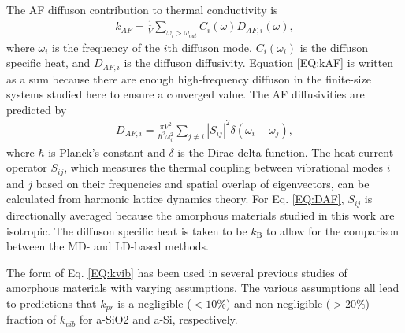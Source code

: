 \documentclass[aps,prb,onecolumn,preprint,superscriptaddress,footinbib,amsmath,amssymb,floatfix]{revtex4}
\begin{document}
The AF diffuson contribution to thermal conductivity is
\cite{feldman_thermal_1993,feldman_numerical_1999}
\begin{equation}\label{EQ:kAF}
\begin{split}
k_{AF} = \frac{1}{V}\sum_{\omega_i>\omega_{cut}} C_i(\omega) D_{AF,i}(\omega), 
\end{split}
\end{equation}
where $\omega_i$ is the frequency of the $i$th diffuson mode, $C_i(\omega_i)$ 
is the diffuson specific heat, and $D_{AF,i}$ is the diffuson diffusivity.
Equation \eqref{EQ:kAF} is written as a sum because there are enough 
high-frequency 
diffuson in the finite-size systems studied here to ensure a converged 
value.\cite{feldman_thermal_1993,feldman_numerical_1999} 
The AF diffusivities are predicted by\cite{allen_thermal_1993} 
\begin{equation}\label{EQ:DAF}
\begin{split}
D_{AF,i} = \frac{\pi V^2}{\hbar^2\omega^2_i}\sum_{j\neq i}
|S_{ij}|^2 \delta(\omega_i - \omega_j),
\end{split}
\end{equation}
where $\hbar$ is Planck's constant and $\delta$ is the Dirac delta 
function. The heat current operator $S_{ij}$,
which measures the thermal coupling 
between vibrational modes $i$ and $j$ based on their frequencies and 
spatial overlap of eigenvectors, 
can be calculated from harmonic lattice dynamics theory.
\cite{allen_thermal_1993,feldman_thermal_1993,feldman_numerical_1999} 
For Eq. \eqref{EQ:DAF}, $S_{ij}$ is directionally averaged because 
the amorphous materials studied in this work are isotropic. 
The diffuson specific heat is taken to be $k_{\text{B}}$ 
to allow for the comparison between the MD- and LD-based 
methods.  

The form of Eq. \eqref{EQ:kvib} has been used in 
several previous studies of amorphous materials with varying 
assumptions.\cite{feldman_thermal_1993,cahill_thermal_1994,
baldi_thermal_2008,
liu_high_2009,yang_anomalously_2010,feldman_numerical_1999,
baldi_thermal_2008,he_heat_2011} 
The various 
assumptions all lead to predictions that $k_{pr}$ is a negligible 
($< 10\%$) 
and non-negligible ($> 20\%$) fraction of $k_{vib}$ 
for 
a-SiO2\cite{baldi_thermal_2008} and 
a-Si\cite{feldman_thermal_1993,cahill_thermal_1994,
feldman_numerical_1999,liu_high_2009,yang_anomalously_2010,
he_heat_2011}, respectively.  
\end{document}
